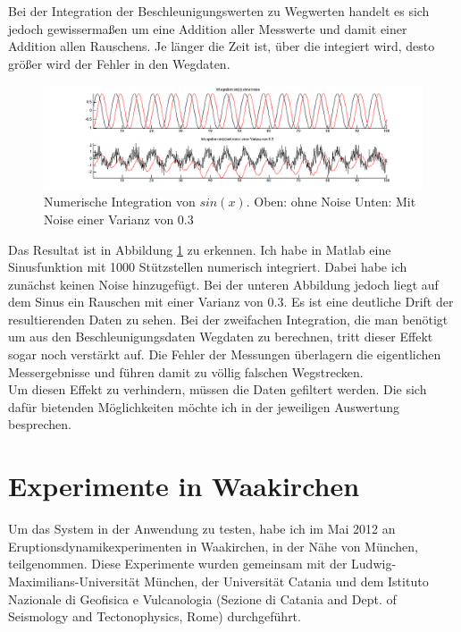 \documentclass[12pt,a4paper]{scrartcl}
\begin{document}
Bei der Integration der Beschleunigungswerten zu Wegwerten handelt es sich jedoch gewissermaßen um eine Addition aller Messwerte und damit einer Addition allen Rauschens. Je länger die Zeit ist, über die integiert wird, desto größer wird der Fehler in den Wegdaten. 

\begin{figure}[htb]
\centering
\includegraphics[scale=.4]{sinusnoise.png}
\caption{Numerische Integration von $sin(x)$. Oben: ohne Noise Unten: Mit Noise einer Varianz von 0.3}
\label{sinusnoise}
\end{figure}

Das Resultat ist in Abbildung \ref{sinusnoise} zu erkennen. Ich habe in Matlab eine Sinusfunktion mit 1000 Stützstellen numerisch integriert. Dabei habe ich zunächst keinen Noise hinzugefügt. Bei der unteren Abbildung jedoch liegt auf dem Sinus ein Rauschen mit einer Varianz von $0.3$. Es ist eine deutliche Drift der resultierenden Daten zu sehen. Bei der zweifachen Integration, die man benötigt um aus den Beschleunigungsdaten Wegdaten zu berechnen, tritt dieser Effekt sogar noch verstärkt auf. Die Fehler der Messungen überlagern die eigentlichen Messergebnisse und führen damit zu völlig falschen Wegstrecken. \\

Um diesen Effekt zu verhindern, müssen die Daten gefiltert werden. Die sich dafür bietenden Möglichkeiten möchte ich in der jeweiligen Auswertung besprechen.

\section{Experimente in Waakirchen}

Um das System in der Anwendung zu testen, habe ich im Mai 2012 an Eruptionsdynamikexperimenten in Waakirchen, in der Nähe von München, teilgenommen. Diese Experimente wurden gemeinsam mit der Ludwig-Maximilians-Universität München, der Universität Catania und dem Istituto Nazionale di Geofisica e Vulcanologia (Sezione di Catania and Dept. of Seismology and Tectonophysics, Rome) durchgeführt. 
\end{document}
